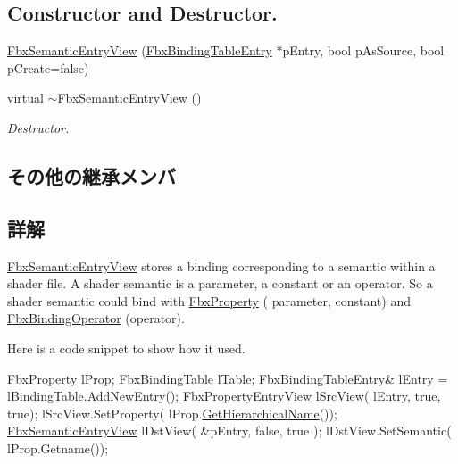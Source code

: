 \subsection*{Constructor and Destructor.}
\begin{DoxyCompactItemize}
\item 
\hyperlink{class_fbx_semantic_entry_view_a9431f63d5fdde94d264056fa3f3b6df1}{Fbx\+Semantic\+Entry\+View} (\hyperlink{class_fbx_binding_table_entry}{Fbx\+Binding\+Table\+Entry} $\ast$p\+Entry, bool p\+As\+Source, bool p\+Create=false)
\item 
virtual \hyperlink{class_fbx_semantic_entry_view_a3efcf8b9e3ff9b4d9656910786f88238}{$\sim$\+Fbx\+Semantic\+Entry\+View} ()
\begin{DoxyCompactList}\small\item\em Destructor. \end{DoxyCompactList}\end{DoxyCompactItemize}
\subsection*{その他の継承メンバ}


\subsection{詳解}
\hyperlink{class_fbx_semantic_entry_view}{Fbx\+Semantic\+Entry\+View} stores a binding corresponding to a semantic within a shader file. A shader semantic is a parameter, a constant or an operator. So a shader semantic could bind with \hyperlink{class_fbx_property}{Fbx\+Property} ( parameter, constant) and \hyperlink{class_fbx_binding_operator}{Fbx\+Binding\+Operator} (operator).

Here is a code snippet to show how it used. 
\begin{DoxyCode}
\hyperlink{class_fbx_property}{FbxProperty} lProp;
\hyperlink{class_fbx_binding_table}{FbxBindingTable} lTable;
\hyperlink{class_fbx_binding_table_entry}{FbxBindingTableEntry}& lEntry = lBindingTable.AddNewEntry();
\hyperlink{class_fbx_property_entry_view}{FbxPropertyEntryView} lSrcView( lEntry, \textcolor{keyword}{true}, \textcolor{keyword}{true});
lSrcView.SetProperty( lProp.\hyperlink{class_fbx_property_a6045fdbb1bbe5a84f44c7f447d2fa52c}{GetHierarchicalName}());
\hyperlink{class_fbx_semantic_entry_view}{FbxSemanticEntryView} lDstView( &pEntry, \textcolor{keyword}{false}, \textcolor{keyword}{true} );
lDstView.SetSemantic( lProp.Getname());
\end{DoxyCode}


